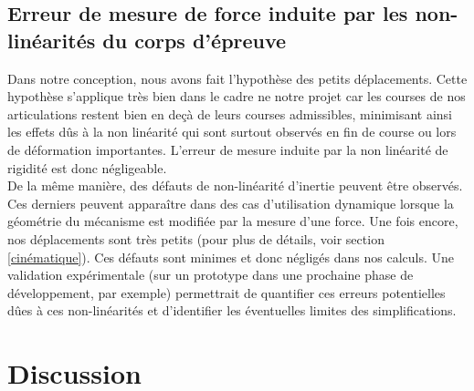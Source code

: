 \documentclass[a4paper, 11pt]{article} %
\begin{document}
\subsection{Erreur de mesure de force induite par les non-linéarités du corps d’épreuve}
Dans notre conception, nous avons fait l'hypothèse des petits déplacements. Cette hypothèse s'applique très bien dans le cadre ne notre projet car les courses de nos articulations restent bien en deçà de leurs courses admissibles, minimisant ainsi les effets dûs à la non linéarité qui sont surtout observés en fin de course ou lors de déformation importantes. L'erreur de mesure induite par la non linéarité de rigidité est donc négligeable. 
\\De la même manière, des défauts de non-linéarité d'inertie peuvent être observés.  Ces derniers peuvent apparaître dans des cas d'utilisation dynamique lorsque la géométrie du mécanisme est modifiée par la mesure d'une force. Une fois encore, nos déplacements sont très petits (pour plus de détails, voir section \ref{cinématique}). Ces défauts sont minimes et donc négligés dans nos calculs. Une validation expérimentale (sur un prototype dans une prochaine phase de développement, par exemple) permettrait de quantifier ces erreurs potentielles dûes à ces non-linéarités et d'identifier les éventuelles limites des simplifications.



\section{Discussion}
\end{document}
